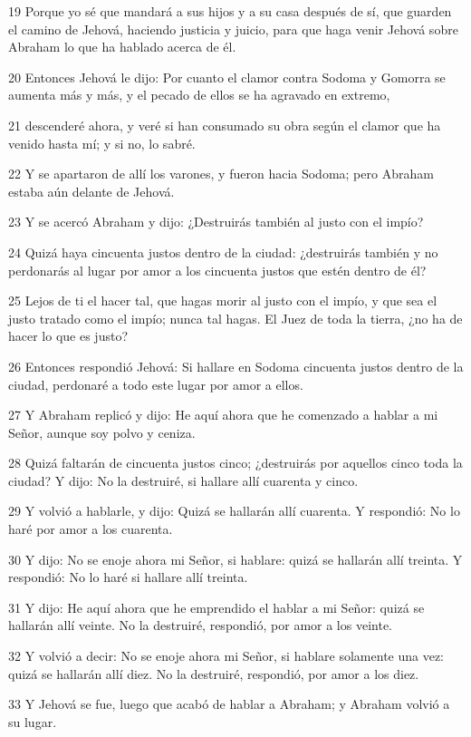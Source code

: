 19 Porque yo sé que mandará a sus hijos y a su casa después de sí, que guarden el camino de Jehová, haciendo justicia y juicio, para que haga venir Jehová sobre Abraham lo que ha hablado acerca de él.

20 Entonces Jehová le dijo: Por cuanto el clamor contra Sodoma y Gomorra se aumenta más y más, y el pecado de ellos se ha agravado en extremo,

21 descenderé ahora, y veré si han consumado su obra según el clamor que ha venido hasta mí; y si no, lo sabré.

22 Y se apartaron de allí los varones, y fueron hacia Sodoma; pero Abraham estaba aún delante de Jehová.

23 Y se acercó Abraham y dijo: ¿Destruirás también al justo con el impío?

24 Quizá haya cincuenta justos dentro de la ciudad: ¿destruirás también y no perdonarás al lugar por amor a los cincuenta justos que estén dentro de él?

25 Lejos de ti el hacer tal, que hagas morir al justo con el impío, y que sea el justo tratado como el impío; nunca tal hagas. El Juez de toda la tierra, ¿no ha de hacer lo que es justo?

26 Entonces respondió Jehová: Si hallare en Sodoma cincuenta justos dentro de la ciudad, perdonaré a todo este lugar por amor a ellos.

27 Y Abraham replicó y dijo: He aquí ahora que he comenzado a hablar a mi Señor, aunque soy polvo y ceniza.

28 Quizá faltarán de cincuenta justos cinco; ¿destruirás por aquellos cinco toda la ciudad? Y dijo: No la destruiré, si hallare allí cuarenta y cinco.

29 Y volvió a hablarle, y dijo: Quizá se hallarán allí cuarenta. Y respondió: No lo haré por amor a los cuarenta.

30 Y dijo: No se enoje ahora mi Señor, si hablare: quizá se hallarán allí treinta. Y respondió: No lo haré si hallare allí treinta.

31 Y dijo: He aquí ahora que he emprendido el hablar a mi Señor: quizá se hallarán allí veinte. No la destruiré, respondió, por amor a los veinte.

32 Y volvió a decir: No se enoje ahora mi Señor, si hablare solamente una vez: quizá se hallarán allí diez. No la destruiré, respondió, por amor a los diez.

33 Y Jehová se fue, luego que acabó de hablar a Abraham; y Abraham volvió a su lugar.

